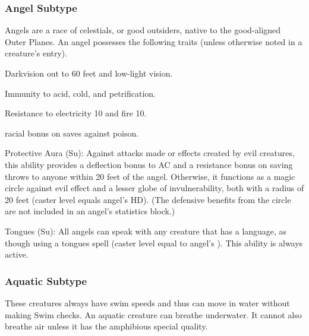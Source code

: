 {\subsubsection{Angel Subtype} Angels are a race of celestials, or good outsiders, native to the good-aligned Outer Planes.
 An angel possesses the following traits (unless otherwise noted in a creature's entry).
\begin{itemize*}
\item Darkvision out to 60 feet and low-light vision.
\item Immunity to acid, cold, and petrification.
\item Resistance to electricity 10 and fire 10.
\item {} racial bonus on saves against poison.
\item Protective Aura (Su): Against attacks made or effects created by evil creatures, this ability provides a  deflection bonus to AC and a  resistance bonus on saving throws to anyone within 20 feet of the angel. Otherwise, it functions as a magic circle against evil effect and a lesser globe of invulnerability, both with a radius of 20 feet (caster level equals angel's HD). (The defensive benefits from the circle are not included in an angel's statistics block.) 
\item Tongues (Su): All angels can speak with any creature that has a language, as though using a tongues spell (caster level equal to angel's ). This ability is always active.
\end{itemize*}

\subsubsection{Aquatic Subtype} These creatures always have swim speeds and thus can move in water without making Swim checks. An aquatic creature can breathe underwater. It cannot also breathe air unless it has the amphibious special quality. 

}
